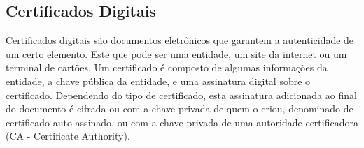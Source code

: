 \documentclass{article}
\begin{document}
		\subsection{Certificados Digitais}
			\begin{justify}
			
				
					\hspace{2cm}Certificados digitais são documentos eletrônicos que garantem a autenticidade de um certo elemento. Este que pode ser uma entidade, um site da internet ou um terminal de cartões. Um certificado é composto de algumas informações da entidade,  a chave pública da entidade, e uma assinatura digital sobre o certificado. Dependendo do tipo de certificado, esta assinatura adicionada ao final do documento é cifrada ou com a chave privada de quem o criou, denominado de certificado auto-assinado, ou com a chave privada de uma autoridade certificadora (CA - Certificate Authority). \\

			
			\end{justify}

    
\end{document}
